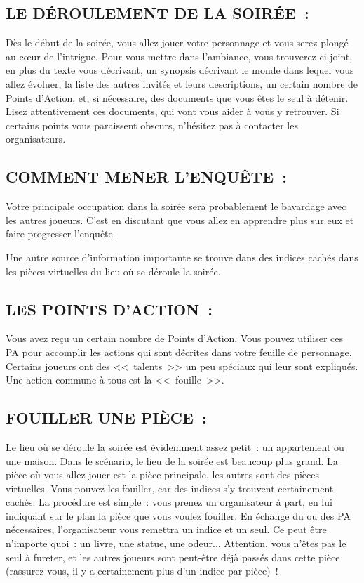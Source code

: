\documentclass[14pt,twocolumn]{extarticle}
\begin{document}
\subsection{LE DÉROULEMENT DE LA SOIRÉE~:}

Dès le début de la soirée, vous allez jouer votre personnage et vous serez
plongé au c\oe{}ur de l'intrigue. Pour vous mettre dans l'ambiance, vous
trouverez ci-joint, en plus du texte vous décrivant, un synopsis décrivant le
monde dans lequel vous allez évoluer, la liste des autres invités et leurs
descriptions, un certain nombre de Points d'Action, et, si nécessaire, des
documents que vous êtes le seul à détenir. Lisez attentivement ces documents,
qui vont vous aider à vous y retrouver. Si certains points vous paraissent
obscurs, n'hésitez pas à contacter les organisateurs.

\subsection{COMMENT MENER L'ENQUÊTE~:}

Votre principale occupation dans la soirée sera probablement le bavardage avec
les autres joueurs. C'est en discutant que vous allez en apprendre plus sur eux
et faire progresser l'enquête.

Une autre source d'information importante se trouve dans des indices cachés
dans les pièces virtuelles du lieu où se déroule la soirée.

\subsection{LES POINTS D'ACTION~:}

Vous avez reçu un certain nombre de Points d'Action. Vous pouvez utiliser ces
PA pour accomplir les actions qui sont décrites dans votre feuille de
personnage. Certains joueurs ont des <<~talents~>> un peu spéciaux qui leur
sont expliqués. Une action commune à tous est la <<~fouille~>>.

\subsection{FOUILLER UNE PIÈCE~:}

Le lieu où se déroule la soirée est évidemment assez petit~: un appartement ou
une maison. Dans le scénario, le lieu de la soirée est beaucoup plus grand. La
pièce où vous allez jouer est la pièce principale, les autres sont des pièces
virtuelles. Vous pouvez les fouiller, car des indices s'y trouvent certainement
cachés. La procédure est simple~: vous prenez un organisateur à part, en lui
indiquant sur le plan la pièce que vous voulez fouiller. En échange du ou des
PA nécessaires, l'organisateur vous remettra un indice et un seul. Ce peut être
n'importe quoi~: un livre, une statue, une odeur... Attention, vous n'êtes pas
le seul à fureter, et les autres joueurs sont peut-être déjà passés dans cette
pièce (rassurez-vous, il y a certainement plus d'un indice par pièce)~!
\end{document}
